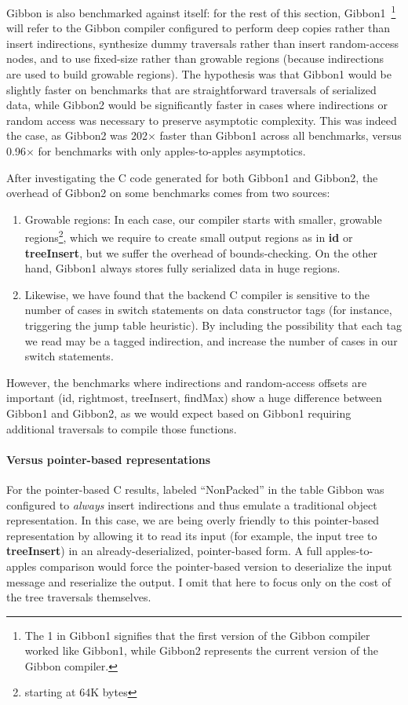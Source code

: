 \documentclass[showabstract,showacknowledgments,showpreface,showdedication,school]{iuphd}
\theoremstyle{nonumberplain}
\begin{document}
Gibbon is also benchmarked against itself: for the rest of this section,
Gibbon1~\footnote{The 1 in Gibbon1 signifies that the first version of the
Gibbon compiler worked like Gibbon1, while Gibbon2 represents the current
version of the Gibbon compiler.} will refer to the Gibbon compiler configured to
perform deep copies rather than insert indirections, synthesize dummy traversals
rather than insert random-access nodes, and to use fixed-size rather than
growable regions (because indirections are used to build growable regions). The
hypothesis was that Gibbon1 would be slightly faster on benchmarks that are
straightforward traversals of serialized data, while Gibbon2 would be
significantly faster in cases where indirections or random access was necessary
to preserve asymptotic complexity. This was indeed the case, as Gibbon2 was
202$\times$ faster than Gibbon1 across all benchmarks, versus 0.96$\times$ for
benchmarks with only apples-to-apples asymptotics.





After investigating the C code generated for both Gibbon1 and Gibbon2,
the overhead of Gibbon2 on some benchmarks comes from two sources:
\begin{enumerate}
\item Growable regions: In each case, our compiler starts with smaller, growable
regions\footnote{starting at 64K bytes}, which we require to create small output
regions as in {\bf id} or {\bf treeInsert}, but we suffer the overhead of
bounds-checking. On the other hand, Gibbon1 always stores fully serialized data
in huge regions.

\item Likewise, we have found that the backend C compiler is sensitive to the
number of cases in switch statements on data constructor tags (for instance,
triggering the jump table heuristic). By including the possibility that each tag
we read may be a tagged indirection, and increase the number of cases in our switch statements.
\end{enumerate}


However, the benchmarks where indirections and random-access offsets are important (id,
rightmost, treeInsert, findMax) show a huge difference between Gibbon1 and Gibbon2,
as we would expect based on Gibbon1
requiring additional traversals to compile those functions.

\paragraph{Versus pointer-based representations}
For the pointer-based C results, labeled ``NonPacked'' in the table
Gibbon was configured to \emph{always} insert indirections
and thus emulate a traditional object representation.
In this case, we are being overly friendly to this pointer-based representation by
allowing it to read its input (for example, the input tree to {\bf treeInsert})
in an already-deserialized, pointer-based form.  A full apples-to-apples
comparison would force the pointer-based version to deserialize the input
message and reserialize the output. I omit that here to focus only on the
cost of the tree traversals themselves.
\end{document}
